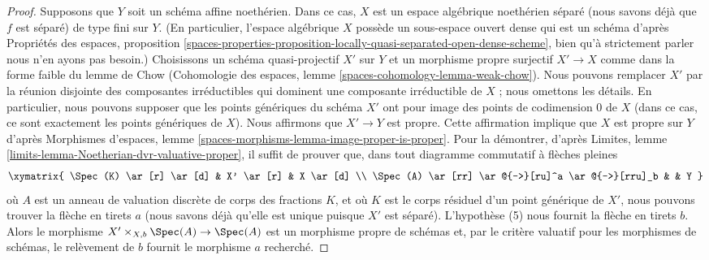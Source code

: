 \begin{proof}
\medskip\noindent
Supposons que $Y$ soit un schéma affine noethérien. Dans ce cas, $X$ est un
espace algébrique noethérien séparé (nous savons déjà que $f$ est séparé)
de type fini sur $Y$. (En particulier, l'espace algébrique $X$
possède un sous-espace ouvert dense qui est un schéma d'après Propriétés des espaces, proposition
\ref{spaces-properties-proposition-locally-quasi-separated-open-dense-scheme},
bien qu'à strictement parler nous n'en ayons pas besoin.)
Choisissons un schéma quasi-projectif $X'$ sur $Y$ et un morphisme propre surjectif
$X' \to X$ comme dans la forme faible du lemme de Chow
(Cohomologie des espaces, lemme \ref{spaces-cohomology-lemma-weak-chow}).
Nous pouvons remplacer $X'$ par la réunion disjointe des composantes irréductibles
qui dominent une composante irréductible de $X$ ; nous omettons les détails.
En particulier, nous pouvons supposer que les points génériques du schéma $X'$ ont pour image
des points de codimension $0$ de $X$ (dans ce cas, ce sont exactement
les points génériques de $X$). Nous affirmons que $X' \to Y$ est propre.
Cette affirmation implique que $X$ est propre sur $Y$ d'après
Morphismes d'espaces, lemme \ref{spaces-morphisms-lemma-image-proper-is-proper}.
Pour la démontrer, d'après
Limites, lemme \ref{limits-lemma-Noetherian-dvr-valuative-proper},
il suffit de prouver que, dans tout diagramme commutatif à flèches pleines
$$
\xymatrix{
\Spec(K) \ar[r] \ar[d] & X' \ar[r] & X \ar[d] \\
\Spec(A) \ar[rr] \ar@{-->}[ru]^a \ar@{-->}[rru]_b & & Y
}
$$
où $A$ est un anneau de valuation discrète de corps des fractions $K$, et où $K$ est le corps résiduel
d'un point générique de $X'$, nous pouvons trouver la
flèche en tirets $a$ (nous savons déjà qu'elle est unique puisque $X'$ est séparé).
L'hypothèse (5) nous fournit la flèche en tirets $b$.
Alors le morphisme $X' \times_{X, b} \Spec(A) \to \Spec(A)$
est un morphisme propre de schémas et, par le critère valuatif
pour les morphismes de schémas, le relèvement de $b$ fournit le morphisme $a$ recherché.
\end{proof}

